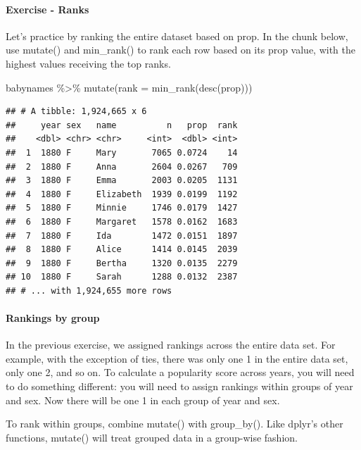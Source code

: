 \documentclass[
]{article}
\newenvironment{Shaded}{\begin{snugshade}}{\end{snugshade}}
\newcommand{\AttributeTok}[1]{\textcolor[rgb]{0.77,0.63,0.00}{#1}}
\newcommand{\FunctionTok}[1]{\textcolor[rgb]{0.00,0.00,0.00}{#1}}
\newcommand{\NormalTok}[1]{#1}
\newcommand{\SpecialCharTok}[1]{\textcolor[rgb]{0.00,0.00,0.00}{#1}}
\begin{document}
\hypertarget{exercise---ranks}{%
\paragraph{Exercise - Ranks}\label{exercise---ranks}}

Let's practice by ranking the entire dataset based on prop. In the chunk
below, use mutate() and min\_rank() to rank each row based on its prop
value, with the highest values receiving the top ranks.

\begin{Shaded}
\begin{Highlighting}[]
\NormalTok{babynames }\SpecialCharTok{\%\textgreater{}\%}
   \FunctionTok{mutate}\NormalTok{(}\AttributeTok{rank =} \FunctionTok{min\_rank}\NormalTok{(}\FunctionTok{desc}\NormalTok{(prop)))}
\end{Highlighting}
\end{Shaded}

\begin{verbatim}
## # A tibble: 1,924,665 x 6
##     year sex   name          n   prop  rank
##    <dbl> <chr> <chr>     <int>  <dbl> <int>
##  1  1880 F     Mary       7065 0.0724    14
##  2  1880 F     Anna       2604 0.0267   709
##  3  1880 F     Emma       2003 0.0205  1131
##  4  1880 F     Elizabeth  1939 0.0199  1192
##  5  1880 F     Minnie     1746 0.0179  1427
##  6  1880 F     Margaret   1578 0.0162  1683
##  7  1880 F     Ida        1472 0.0151  1897
##  8  1880 F     Alice      1414 0.0145  2039
##  9  1880 F     Bertha     1320 0.0135  2279
## 10  1880 F     Sarah      1288 0.0132  2387
## # ... with 1,924,655 more rows
\end{verbatim}

\hypertarget{rankings-by-group}{%
\paragraph{Rankings by group}\label{rankings-by-group}}

In the previous exercise, we assigned rankings across the entire data
set. For example, with the exception of ties, there was only one 1 in
the entire data set, only one 2, and so on. To calculate a popularity
score across years, you will need to do something different: you will
need to assign rankings within groups of year and sex. Now there will be
one 1 in each group of year and sex.

To rank within groups, combine mutate() with group\_by(). Like dplyr's
other functions, mutate() will treat grouped data in a group-wise
fashion.
\end{document}
